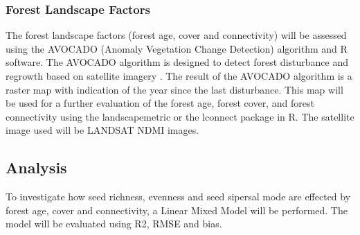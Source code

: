 
\subsubsection{Forest Landscape Factors}
The forest landscape factors (forest age, cover and connectivity) will be assessed using the AVOCADO (Anomaly Vegetation Change Detection) algorithm and R software. The AVOCADO algorithm is designed to detect forest disturbance and regrowth based on satellite imagery \citep{decuyperContinuousMonitoringForest2022}. The result of the AVOCADO algorithm is a raster map with indication of the year since the last disturbance. This map will be used for a further evaluation of the forest age, forest cover, and forest connectivity using the landscapemetric or the lconnect package in R. The satellite image used will be LANDSAT NDMI images. 

\subsection{Analysis}
To investigate how seed richness, evenness and seed sipersal mode are effected by forest age, cover and connectivity, a Linear Mixed Model will be performed. The model will be evaluated using R2, RMSE and bias.

 